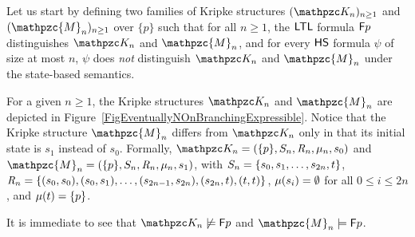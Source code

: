 


Let us start by defining two families of Kripke structures $(\Ku_n)_{n\geq 1}$ and $(\mathpzc{M}_n)_{n\geq 1}$ over $\{p\}$ such that for all $n\geq 1$, the $\text{\sffamily LTL}$ formula $\textsf{F} p$
 distinguishes $\Ku_n$ and  $\mathpzc{M}_n$, and for every $\text{\sffamily HS}$ formula $\psi$ of size at most $n$, $\psi$ does \emph{not} distinguish
 $\Ku_n$ and  $\mathpzc{M}_n$ under the state-based semantics. 
 
For a given $n \geq 1$, the Kripke structures $\Ku_n$ and $\mathpzc{M}_n$ are depicted in
 Figure~\ref{FigEventuallyNOnBranchingExpressible}. Notice that the Kripke structure $\mathpzc{M}_n$  differs from  $\Ku_n$ only in that its initial state is $s_1$ instead of $s_0$. Formally, $\Ku_n=(\{p\},\States_n, \Edges_n,\Lab_n,s_0)$ and $\mathpzc{M}_n=(\{p\},\States_n, \Edges_n,\Lab_n,s_1)$, with
 $S_n=\{s_0,s_1,\ldots, s_{2n},t\}$, $\textit{R}_n=\{(s_0,s_0),(s_0,s_1),\ldots, (s_{2n-1},s_{2n}),\allowbreak (s_{2n},t),(t,t)\}$,  $\mu(s_i)=\emptyset$ for all $0\leq i\leq 2n$, and $\mu(t)=\{p\}$. 
 
It is immediate to see that
%
 $\Ku_n\not\models \Eventually p$ and $\mathpzc{M}_n\models \Eventually p$.

